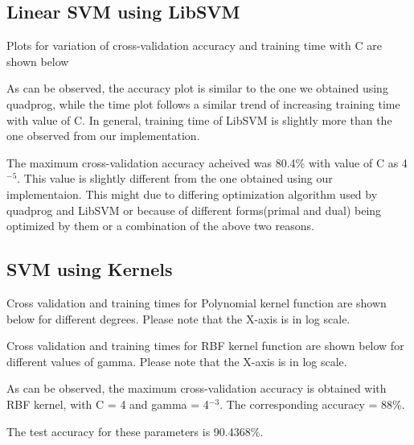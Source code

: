 \documentclass[11pt]{article}
\begin{document}
\subsection{Linear SVM using LibSVM}
Plots for variation of cross-validation accuracy and training time with C are shown below

As can be observed, the accuracy plot is similar to the one we obtained using quadprog, while the time plot follows a similar trend of increasing training time with value of C. In general, training time of LibSVM is slightly more than the one observed from our implementation.

The maximum cross-validation accuracy acheived was 80.4\% with value of C as 4$^{-5}$. This value is slightly different from the one obtained using our implementaion. This might due to differing optimization algorithm used by quadprog and LibSVM or because of different forms(primal and dual) being optimized by them or a combination of the above two reasons.
\newpage
\subsection{SVM using Kernels}
Cross validation and training times for Polynomial kernel function are shown below for different degrees. Please note that the X-axis is in log scale.

Cross validation and training times for RBF kernel function are shown below for different values of gamma. Please note that the X-axis is in log scale.

As can be observed, the maximum cross-validation accuracy is obtained with RBF kernel, with C = 4 and gamma = 4$^{-3}$. The corresponding accuracy = 88\%.

The test accuracy for these parameters is 90.4368\%.
\end{document}
